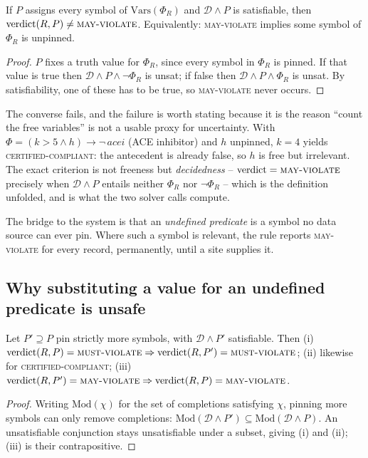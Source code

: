 \begin{proposition}[Determinacy]
\label{prop:determinacy}
If $P$ assigns every symbol of $\mathrm{Vars}(\Phi_R)$ and $\mathcal{D} \wedge P$
is satisfiable, then $\mathrm{verdict}(R,P) \neq \textsc{may-violate}$.
Equivalently: \textsc{may-violate} implies some symbol of $\Phi_R$ is unpinned.
\end{proposition}
\begin{proof}
$P$ fixes a truth value for $\Phi_R$, since every symbol in $\Phi_R$ is pinned. If that value is true then $\mathcal{D}\wedge P\wedge\neg\Phi_R$ is
unsat; if false then $\mathcal{D}\wedge P\wedge\Phi_R$ is unsat. By satisfiability, one of these has to be true, so \textsc{may-violate} never occurs.
\end{proof}

The converse fails, and the failure is worth stating because it is the reason
``count the free variables'' is not a usable proxy for uncertainty. With
$\Phi = (k > 5 \wedge h) \rightarrow \neg\,\mathit{acei}$ (ACE inhibitor) and $h$ unpinned,
$k = 4$ yields \textsc{certified-compliant}: the antecedent is already false, so
$h$ is free but irrelevant. The exact criterion is not freeness but
\emph{decidedness} -- $\mathrm{verdict} = \textsc{may-violate}$ precisely when
$\mathcal{D} \wedge P$ entails neither $\Phi_R$ nor $\neg\Phi_R$ -- which is the
definition unfolded, and is what the two solver calls compute.

The bridge to the system is that an \emph{undefined predicate} is a symbol no
data source can ever pin. Where such a symbol is relevant, the rule reports
\textsc{may-violate} for every record, permanently, until a site supplies it.

\subsection{Why substituting a value for an undefined predicate is unsafe}

\begin{proposition}
\label{prop:monotone}
Let $P' \supseteq P$ pin strictly more symbols, with $\mathcal{D}\wedge P'$
satisfiable. Then
\textup{(i)} $\mathrm{verdict}(R,P)=\textsc{must-violate} \Rightarrow
\mathrm{verdict}(R,P')=\textsc{must-violate}$;
\textup{(ii)} likewise for \textsc{certified-compliant};
\textup{(iii)} $\mathrm{verdict}(R,P')=\textsc{may-violate} \Rightarrow
\mathrm{verdict}(R,P)=\textsc{may-violate}$.
\end{proposition}
\begin{proof}
Writing $\mathrm{Mod}(\chi)$ for the set of completions satisfying $\chi$,
pinning more symbols can only remove completions:
$\mathrm{Mod}(\mathcal{D}\wedge P') \subseteq \mathrm{Mod}(\mathcal{D}\wedge P)$.
An unsatisfiable conjunction stays unsatisfiable under a subset, giving (i) and
(ii); (iii) is their contrapositive.
\end{proof}

